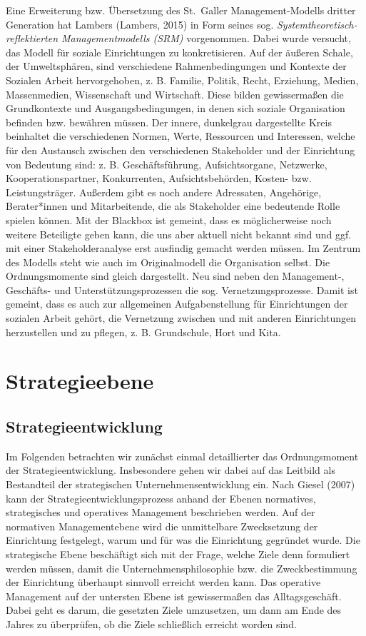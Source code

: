 \documentclass[
  letterpaper,
]{book}
\begin{document}
Eine Erweiterung bzw. Übersetzung des St.~Galler Management-Modells
dritter Generation hat Lambers (Lambers, 2015) in Form seines sog.
\emph{Systemtheoretisch-reflektierten Managementmodells (SRM)}
vorgenommen. Dabei wurde versucht, das Modell für soziale Einrichtungen
zu konkretisieren. Auf der äußeren Schale, der Umweltsphären, sind
verschiedene Rahmenbedingungen und Kontexte der Sozialen Arbeit
hervorgehoben, z. B. Familie, Politik, Recht, Erziehung, Medien,
Massenmedien, Wissenschaft und Wirtschaft. Diese bilden gewissermaßen
die Grundkontexte und Ausgangsbedingungen, in denen sich soziale
Organisation befinden bzw. bewähren müssen. Der innere, dunkelgrau
dargestellte Kreis beinhaltet die verschiedenen Normen, Werte,
Ressourcen und Interessen, welche für den Austausch zwischen den
verschiedenen Stakeholder und der Einrichtung von Bedeutung sind: z. B.
Geschäftsführung, Aufsichtsorgane, Netzwerke, Kooperationspartner,
Konkurrenten, Aufsichtsbehörden, Kosten- bzw. Leistungsträger. Außerdem
gibt es noch andere Adressaten, Angehörige, Berater*innen und
Mitarbeitende, die als Stakeholder eine bedeutende Rolle spielen können.
Mit der Blackbox ist gemeint, dass es möglicherweise noch weitere
Beteiligte geben kann, die uns aber aktuell nicht bekannt sind und ggf.
mit einer Stakeholderanalyse erst ausfindig gemacht werden müssen. Im
Zentrum des Modells steht wie auch im Originalmodell die Organisation
selbst. Die Ordnungsmomente sind gleich dargestellt. Neu sind neben den
Management-, Geschäfts- und Unterstützungsprozessen die sog.
Vernetzungsprozesse. Damit ist gemeint, dass es auch zur allgemeinen
Aufgabenstellung für Einrichtungen der sozialen Arbeit gehört, die
Vernetzung zwischen und mit anderen Einrichtungen herzustellen und zu
pflegen, z. B. Grundschule, Hort und Kita.

\section{Strategieebene}\label{strategieebene}

\subsection{Strategieentwicklung}\label{strategieentwicklung}

Im Folgenden betrachten wir zunächst einmal detaillierter das
Ordnungsmoment der Strategieentwicklung. Insbesondere gehen wir dabei
auf das Leitbild als Bestandteil der strategischen
Unternehmensentwicklung ein. Nach Giesel (2007) kann der
Strategieentwicklungsprozess anhand der Ebenen normatives, strategisches
und operatives Management beschrieben werden. Auf der normativen
Managementebene wird die unmittelbare Zwecksetzung der Einrichtung
festgelegt, warum und für was die Einrichtung gegründet wurde. Die
strategische Ebene beschäftigt sich mit der Frage, welche Ziele denn
formuliert werden müssen, damit die Unternehmensphilosophie bzw. die
Zweckbestimmung der Einrichtung überhaupt sinnvoll erreicht werden kann.
Das operative Management auf der untersten Ebene ist gewissermaßen das
Alltagsgeschäft. Dabei geht es darum, die gesetzten Ziele umzusetzen, um
dann am Ende des Jahres zu überprüfen, ob die Ziele schließlich erreicht
worden sind.
\end{document}
